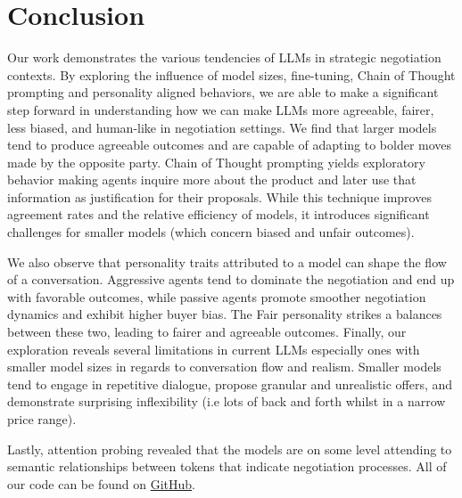 \documentclass[11pt]{article}
\begin{document}

\clearpage
\section{Conclusion}
Our work demonstrates the various tendencies of LLMs in strategic negotiation contexts. By exploring the influence of model sizes, fine-tuning, Chain of Thought prompting and personality aligned behaviors, we are able to make a significant step forward in understanding how we can make LLMs more agreeable, fairer, less biased, and human-like in negotiation settings. We find that larger models tend to produce agreeable outcomes and are capable of adapting to bolder moves made by the opposite party. Chain of Thought prompting yields exploratory behavior making agents inquire more about the product and later use that information as justification for their proposals. While this technique improves agreement rates and the relative efficiency of models, it introduces significant challenges for smaller models (which concern biased and unfair outcomes).

We also observe that personality traits attributed to a model can shape the flow of a conversation. Aggressive agents tend to dominate the negotiation and end up with favorable outcomes, while passive agents promote smoother negotiation dynamics and exhibit higher buyer bias. The Fair personality strikes a balances between these two, leading to fairer and agreeable outcomes. Finally, our exploration reveals several limitations in current LLMs especially ones with smaller model sizes in regards to conversation flow and realism. Smaller models tend to engage in repetitive dialogue, propose granular and unrealistic offers, and demonstrate surprising inflexibility (i.e lots of back and forth whilst in a narrow price range). 

Lastly, attention probing revealed that the models are on some level attending to semantic relationships between tokens that indicate negotiation processes. All of our code can be found on \href{https://github.com/GeneralCoder365/agreemate}{GitHub}.



\end{document}

